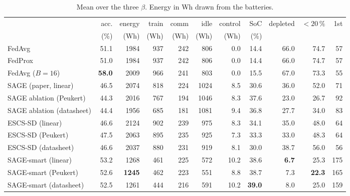 \documentclass[11pt,a4paper]{article}
\begin{document}
\begin{table}[H]
\centering
\small
\caption{Mean over the three $\beta$. Energy in Wh drawn from the batteries.}
\label{tab:main}
\begin{tabular}{lrrrrrrrrrr}
\toprule
& acc. & energy & train & comm & idle & control & SoC & depleted & $<20\,\%$ & 1st \\
& (\%) & (Wh) & (Wh) & (Wh) & (Wh) & (Wh) & (\%) & & & \\
\midrule
FedAvg                    & 51.1 & 1984 & 937 & 242 &  806 &  0.0 & 14.4 & 66.0 & 74.7 &  57 \\
FedProx                   & 51.0 & 1984 & 937 & 242 &  806 &  0.0 & 14.4 & 66.0 & 74.7 &  57 \\
FedAvg ($B=16$)           & \textbf{58.0} & 2009 & 966 & 241 & 803 & 0.0 & 15.5 & 67.0 & 73.3 & 55 \\
\midrule
SAGE (paper, linear)      & 46.5 & 2074 & 818 & 224 & 1024 &  8.5 & 30.6 & 36.0 & 52.0 &  71 \\
SAGE ablation (Peukert)   & 44.3 & 2016 & 767 & 194 & 1046 &  8.3 & 37.6 & 23.0 & 26.7 &  92 \\
SAGE ablation (datasheet) & 44.4 & 1956 & 685 & 181 & 1081 &  9.4 & 36.8 & 27.7 & 34.0 &  83 \\
\midrule
ESCS-SD (linear)          & 46.6 & 2124 & 902 & 239 &  975 &  8.3 & 34.1 & 35.0 & 48.0 &  64 \\
ESCS-SD (Peukert)         & 47.5 & 2063 & 895 & 235 &  925 &  7.3 & 33.3 & 33.0 & 48.3 &  64 \\
ESCS-SD (datasheet)       & 46.6 & 2037 & 880 & 231 &  919 &  8.1 & 30.0 & 38.7 & 56.0 &  56 \\
\midrule
SAGE-smart (linear)       & 53.2 & 1268 & 461 & 225 & 572 & 10.2 & 38.6 & \textbf{6.7} & 25.3 & 175 \\
SAGE-smart (Peukert)      & 52.6 & \textbf{1245} & 462 & 223 & 551 &  8.8 & 38.7 & 7.3 & \textbf{22.3} & 165 \\
SAGE-smart (datasheet)    & 52.5 & 1261 & 444 & 216 & 591 & 10.2 & \textbf{39.0} & 8.0 & 25.0 & 159 \\
\bottomrule
\end{tabular}
\end{table}
\end{document}
